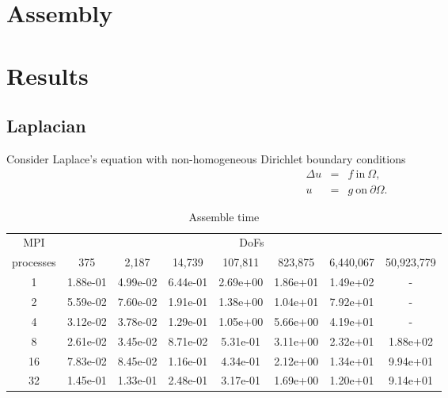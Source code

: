 \documentclass{article}
\begin{document}
\section{Assembly}

\section{Results}

\subsection{Laplacian}

Consider Laplace's equation with non-homogeneous Dirichlet boundary conditions
$$
\begin{array}{rcl}
    \Delta u &=& f \ \mbox{in} \ \Omega,\\
    u &=& g \ \mbox{on} \ \partial\Omega.
\end{array}
$$

\begin{table}[h!]
    \centering
    \begin{tabular}{|c|ccccccc|}
        \hline
        MPI & \multicolumn{7}{c|}{DoFs}\\
        processes &   375     &   2,187    &   14,739   &   107,811  &   823,875  &   6,440,067 & 50,923,779 \\
        \hline
            1 &  1.88e-01 &  4.99e-02 &  6.44e-01 &  2.69e+00 &  1.86e+01 &  1.49e+02 & - \\
            2 &  5.59e-02 &  7.60e-02 &  1.91e-01 &  1.38e+00 &  1.04e+01 &  7.92e+01 & - \\
            4 &  3.12e-02 &  3.78e-02 &  1.29e-01 &  1.05e+00 &  5.66e+00 &  4.19e+01 & - \\
            8 &  2.61e-02 &  3.45e-02 &  8.71e-02 &  5.31e-01 &  3.11e+00 &  2.32e+01 & 1.88e+02 \\
            16 &  7.83e-02 &  8.45e-02 &  1.16e-01 &  4.34e-01 &  2.12e+00 &  1.34e+01 & 9.94e+01 \\
            32 &  1.45e-01 &  1.33e-01 &  2.48e-01 &  3.17e-01 &  1.69e+00 &  1.20e+01 & 9.14e+01 \\
        \hline
    \end{tabular}
    \caption{Assemble time}
\end{table}
\end{document}
